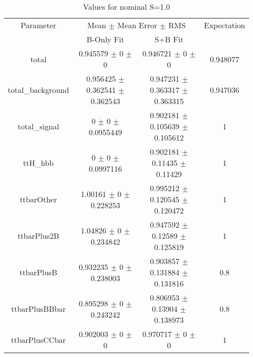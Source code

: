\begin{table}
\centering
\caption{Values for nominal S=1.0}
\begin{tabular}{cccc}
\toprule
Parameter & \multicolumn{2}{c}{Mean $\pm$ Mean Error $\pm$ RMS} & Expectation\\
 & B-Only Fit & S+B Fit & \\
\midrule
total & \num{0.945579} $\pm$ \num{0} $\pm$ \num{0} & \num{0.946721} $\pm$ \num{0} $\pm$ \num{0} & \num{0.948077}\\
total\_background & \num{0.956425} $\pm$ \num{0.362541} $\pm$ \num{0.362543} & \num{0.947231} $\pm$ \num{0.363317} $\pm$ \num{0.363315} & \num{0.947036}\\
total\_signal & \num{0} $\pm$ \num{0} $\pm$ \num{0.0955449} & \num{0.902181} $\pm$ \num{0.105639} $\pm$ \num{0.105612} & \num{1}\\
ttH\_hbb & \num{0} $\pm$ \num{0} $\pm$ \num{0.0997116} & \num{0.902181} $\pm$ \num{0.11435} $\pm$ \num{0.11429} & \num{1}\\
ttbarOther & \num{1.00161} $\pm$ \num{0} $\pm$ \num{0.228253} & \num{0.995212} $\pm$ \num{0.120545} $\pm$ \num{0.120472} & \num{1}\\
ttbarPlus2B & \num{1.04826} $\pm$ \num{0} $\pm$ \num{0.234842} & \num{0.947592} $\pm$ \num{0.12589} $\pm$ \num{0.125819} & \num{1}\\
ttbarPlusB & \num{0.932235} $\pm$ \num{0} $\pm$ \num{0.238003} & \num{0.903857} $\pm$ \num{0.131884} $\pm$ \num{0.131816} & \num{0.8}\\
ttbarPlusBBbar & \num{0.895298} $\pm$ \num{0} $\pm$ \num{0.243242} & \num{0.806953} $\pm$ \num{0.13904} $\pm$ \num{0.138973} & \num{0.8}\\
ttbarPlusCCbar & \num{0.902003} $\pm$ \num{0} $\pm$ \num{0} & \num{0.970717} $\pm$ \num{0} $\pm$ \num{0} & \num{1}\\
\bottomrule
\end{tabular}
\end{table}